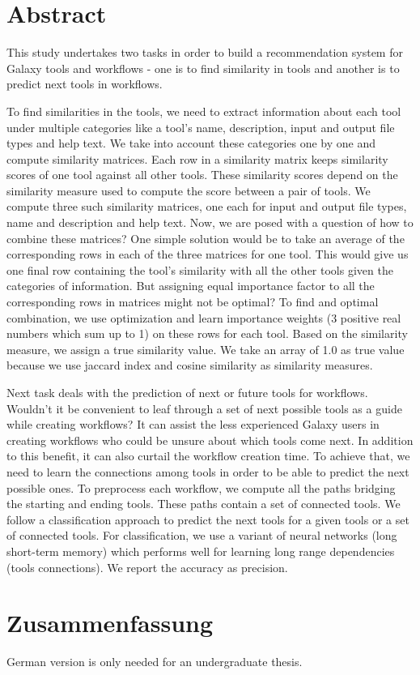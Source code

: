 \chapter*{Abstract}
This study undertakes two tasks in order to build a recommendation system for Galaxy tools and workflows - one is to find similarity in tools and another is to predict next tools in workflows.

To find similarities in the tools, we need to extract information about each tool under multiple categories like a tool's name, description, input and output file types and help text. We take into account these categories one by one and compute similarity matrices. Each row in a similarity matrix keeps similarity scores of one tool against all other tools. These similarity scores depend on the similarity measure used to compute the score between a pair of tools. We compute three such similarity matrices, one each for input and output file types, name and description and help text. Now, we are posed with a question of how to combine these matrices? One simple solution would be to take an average of the corresponding rows in each of the three matrices for one tool. This would give us one final row containing the tool's similarity with all the other tools given the categories of information. But assigning equal importance factor to all the corresponding rows in matrices might not be optimal? To find and optimal combination, we use optimization and learn importance weights (3 positive real numbers which sum up to 1) on these rows for each tool. Based on the similarity measure, we assign a true similarity value. We take an array of 1.0 as true value because we use jaccard index and cosine similarity as similarity measures.

Next task deals with the prediction of next or future tools for workflows. Wouldn't it be convenient to leaf through a set of next possible tools as a guide while creating workflows? It can assist the less experienced Galaxy users in creating workflows who could be unsure about which tools come next. In addition to this benefit, it can also curtail the workflow creation time. To achieve that, we need to learn the connections among tools in order to be able to predict the next possible ones. To preprocess each workflow, we compute all the paths bridging the starting and ending tools. These paths contain a set of connected tools. We follow a classification approach to predict the next tools for a given tools or a set of connected tools. For classification, we use a variant of neural networks (long short-term memory) which performs well for learning long range dependencies (tools connections). We report the accuracy as precision.


\chapter*{Zusammenfassung}
German version is only needed for an undergraduate thesis.